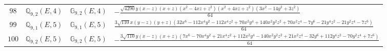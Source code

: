 \documentclass[fleqn,8pt,landscape]{jsarticle}
\begin{document}
\begin{table}[ht!]
\begin{center}
\begin{tabular}{cccl}
$ 98 $ & $ \mathbb{Q}_{9,2}(E,4) $ & $ \mathbb{G}_{9,2}(E,4) $ & $ - \frac{\sqrt{4290} y \left(x - z\right) \left(x + z\right) \left(x^{2} - 4 x z + z^{2}\right) \left(x^{2} + 4 x z + z^{2}\right) \left(3 x^{2} - 14 y^{2} + 3 z^{2}\right)}{64} $ \\
$ 99 $ & $ \mathbb{Q}_{9,1}(E,5) $ & $ \mathbb{G}_{9,1}(E,5) $ & $ \frac{3 \sqrt{110} x \left(y - z\right) \left(y + z\right) \left(32 x^{6} - 112 x^{4} y^{2} - 112 x^{4} z^{2} + 70 x^{2} y^{4} + 140 x^{2} y^{2} z^{2} + 70 x^{2} z^{4} - 7 y^{6} - 21 y^{4} z^{2} - 21 y^{2} z^{4} - 7 z^{6}\right)}{64} $ \\
$ 100 $ & $ \mathbb{Q}_{9,2}(E,5) $ & $ \mathbb{G}_{9,2}(E,5) $ & $ - \frac{3 \sqrt{110} y \left(x - z\right) \left(x + z\right) \left(7 x^{6} - 70 x^{4} y^{2} + 21 x^{4} z^{2} + 112 x^{2} y^{4} - 140 x^{2} y^{2} z^{2} + 21 x^{2} z^{4} - 32 y^{6} + 112 y^{4} z^{2} - 70 y^{2} z^{4} + 7 z^{6}\right)}{64} $ \\
 \hline \hline
\end{tabular}
\end{center}
\end{table}
\end{document}
